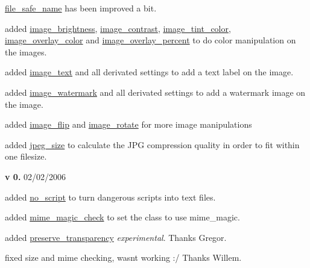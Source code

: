 \begin{DoxyItemize}
\begin{DoxyItemize}
\item \hyperlink{}{file\+\_\+safe\+\_\+name} has been improved a bit.~\newline

\item added \hyperlink{}{image\+\_\+brightness}, \hyperlink{}{image\+\_\+contrast}, \hyperlink{}{image\+\_\+tint\+\_\+color}, \hyperlink{}{image\+\_\+overlay\+\_\+color} and \hyperlink{}{image\+\_\+overlay\+\_\+percent} to do color manipulation on the images.~\newline

\item added \hyperlink{}{image\+\_\+text} and all derivated settings to add a text label on the image.~\newline

\item added \hyperlink{}{image\+\_\+watermark} and all derivated settings to add a watermark image on the image.~\newline

\item added \hyperlink{}{image\+\_\+flip} and \hyperlink{}{image\+\_\+rotate} for more image manipulations~\newline

\item added \hyperlink{}{jpeg\+\_\+size} to calculate the J\+P\+G compression quality in order to fit within one filesize. 
\end{DoxyItemize}
\item {\bfseries v 0.} 02/02/2006~\newline

\begin{DoxyItemize}
\item added \hyperlink{}{no\+\_\+script} to turn dangerous scripts into text files.~\newline

\item added \hyperlink{}{mime\+\_\+magic\+\_\+check} to set the class to use mime\+\_\+magic.~\newline

\item added \hyperlink{}{preserve\+\_\+transparency} {\itshape experimental}. Thanks Gregor.~\newline

\item fixed size and mime checking, wasn\textquotesingle{}t working \+:/ Thanks Willem.~\newline


\end{DoxyItemize}
\end{DoxyItemize}
